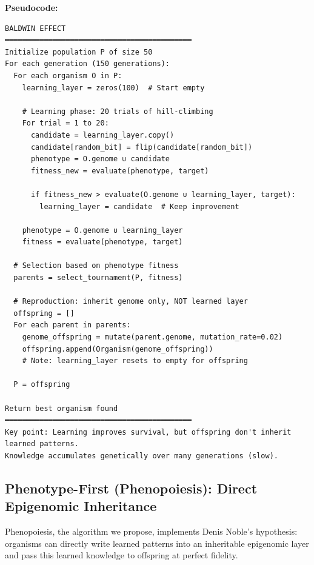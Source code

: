 \documentclass[12pt]{article}
\begin{document}
\textbf{Pseudocode:}
\begin{verbatim}
BALDWIN EFFECT
━━━━━━━━━━━━━━━━━━━━━━━━━━━━━━━━━━━━━━━━━━━
Initialize population P of size 50
For each generation (150 generations):
  For each organism O in P:
    learning_layer = zeros(100)  # Start empty

    # Learning phase: 20 trials of hill-climbing
    For trial = 1 to 20:
      candidate = learning_layer.copy()
      candidate[random_bit] = flip(candidate[random_bit])
      phenotype = O.genome ∪ candidate
      fitness_new = evaluate(phenotype, target)

      if fitness_new > evaluate(O.genome ∪ learning_layer, target):
        learning_layer = candidate  # Keep improvement

    phenotype = O.genome ∪ learning_layer
    fitness = evaluate(phenotype, target)

  # Selection based on phenotype fitness
  parents = select_tournament(P, fitness)

  # Reproduction: inherit genome only, NOT learned layer
  offspring = []
  For each parent in parents:
    genome_offspring = mutate(parent.genome, mutation_rate=0.02)
    offspring.append(Organism(genome_offspring))
    # Note: learning_layer resets to empty for offspring

  P = offspring

Return best organism found
━━━━━━━━━━━━━━━━━━━━━━━━━━━━━━━━━━━━━━━━━━━
Key point: Learning improves survival, but offspring don't inherit learned patterns.
Knowledge accumulates genetically over many generations (slow).
\end{verbatim}

\subsection*{Phenotype-First (Phenopoiesis): Direct Epigenomic Inheritance}

Phenopoiesis, the algorithm we propose, implements Denis Noble's hypothesis: organisms can directly write learned patterns into an inheritable epigenomic layer and pass this learned knowledge to offspring at perfect fidelity.
\end{document}
